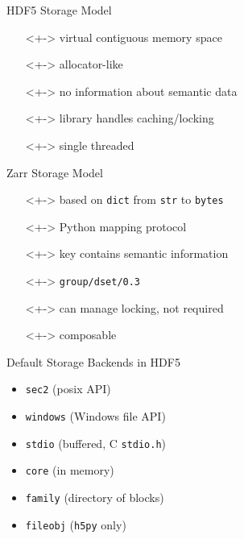 \documentclass{beamer}
\begin{document}
\begin{frame}{HDF5 Storage Model}
  \begin{itemize}
  \item[]<+-> virtual contiguous memory space
  \item[]<+-> allocator-like
  \item[]<+-> no information about semantic data
  \item[]<+-> library handles caching/locking
  \item[]<+-> single threaded
  \end{itemize}
\end{frame}

\begin{frame}{Zarr Storage Model}
  \begin{itemize}
  \item[]<+-> based on \texttt{dict} from \texttt{str} to \texttt{bytes}
  \item[]<+-> Python mapping protocol
  \item[]<+-> key contains semantic information
  \item[]<+-> \texttt{group/dset/0.3}
  \item[]<+-> can manage locking, not required
  \item[]<+-> composable
  \end{itemize}
\end{frame}

\begin{frame}{Default Storage Backends in HDF5}
  \begin{itemize}
  \item<+-> \texttt{sec2} (posix API)
  \item<+-> \texttt{windows} (Windows file API)
  \item<+-> \texttt{stdio} (buffered, C \texttt{stdio.h})
  \item<+-> \texttt{core} (in memory)
  \item<+-> \texttt{family} (directory of blocks)
  \item<+-> \texttt{fileobj} (\texttt{h5py} only)
  \end{itemize}
\end{frame}
\end{document}
